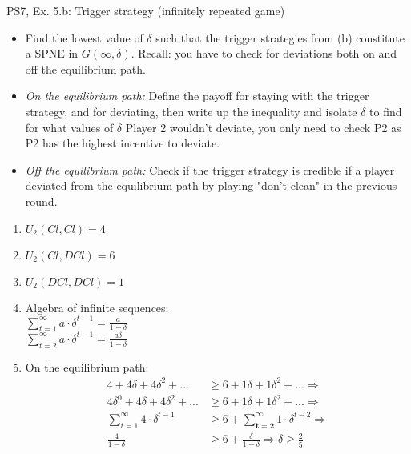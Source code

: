 \begin{frame}{PS7, Ex. 5.b: Trigger strategy (infinitely repeated game)}
    \begin{itemize}
        \item[(b)] Find the lowest value of $\delta$ such that the trigger strategies from (b) constitute a SPNE in $G(\infty,\delta)$. Recall: you have to check for deviations both on and off the equilibrium path.
    \end{itemize}
    \vspace{-8pt}
  \begin{multicols}{2}
    \begin{itemize}
        \item[(Step a)] \textit{On the equilibrium path:} Define the payoff for staying with the trigger strategy, and for deviating, then write up the inequality and isolate $\delta$ to find for what values of $\delta$ Player 2 wouldn't deviate, you only need to check P2 as P2 has the highest incentive to deviate.
        \item[(Step b)] \textit{Off the equilibrium path:} Check if the trigger strategy is credible if a player deviated from the equilibrium path by playing "don't clean" in the previous round.
    \end{itemize}
    \vfill\null\columnbreak
    \begin{enumerate}
        \item $U_2(Cl,Cl) = 4$
        \item $U_2(Cl,DCl) = 6$
        \item $U_2(DCl,DCl) = 1$
        \item Algebra of infinite sequences:\\ $\sum_{t=1}^{\infty} a\cdot\delta^{t-1} = \frac{a}{1-\delta}$ \\ $\sum_{t=2}^{\infty} a\cdot\delta^{t-1} = \frac{a\delta}{1-\delta}$
        \item On the equilibrium path:\vspace{-4pt}
        \begin{align*}
            4+4\delta+4\delta^2+...&\geq6+1\delta+1\delta^2+...\Rightarrow\\
            4\delta^0+4\delta+4\delta^2+...&\geq6+1\delta+1\delta^2+...\Rightarrow\\
            \sum_{t=1}^{\infty} 4\cdot\delta^{t-1}&\geq6 + \sum_{\bm{t=2}}^{\infty} 1\cdot\delta^{t-2}\Rightarrow\\
            \frac{4}{1-\delta} &\geq 6 + \frac{\delta}{1-\delta}\Rightarrow
            \delta \geq \frac{2}{5}
        \end{align*}
    \end{enumerate}
    \vfill\null
  \end{multicols}
\end{frame}

